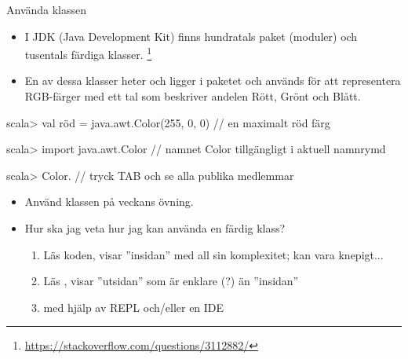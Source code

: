 \begin{Slide}{Använda klassen }\SlideFontSmall
\begin{itemize}
\item I JDK (Java Development Kit) finns hundratals paket (moduler) och tusentals färdiga klasser.
\footnote{\SlideFontTiny\url{https://stackoverflow.com/questions/3112882/}}

\item En av dessa klasser heter  och ligger i paketet  och används för att representera RGB-färger med ett tal som beskriver andelen Rött, Grönt och Blått.
\end{itemize}
\begin{REPL}
scala> val röd = java.awt.Color(255, 0, 0)    //  en maximalt röd färg

scala> import java.awt.Color  // namnet Color tillgängligt i aktuell namnrymd

scala> Color.    // tryck TAB och se alla publika medlemmar
\end{REPL}
\pause
\begin{itemize}
\item Använd klassen  på veckans övning.
\item Hur ska jag veta hur jag kan använda en färdig klass?
\pause
\begin{enumerate}\SlideFontTiny
  \item Läs koden, visar ''insidan'' med all sin komplexitet; kan vara knepigt...
  \item Läs , visar ''utsidan'' som är enklare (?) än ''insidan''
  \item {} med hjälp av REPL och/eller en IDE
\end{enumerate}
\end{itemize}

\end{Slide}


